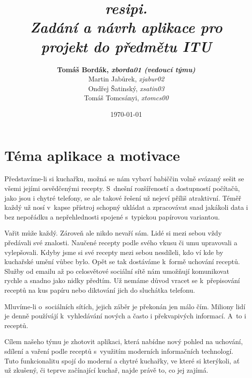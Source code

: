 \documentclass[a4paper, 11pt]{article}
\title {
    {\Huge \emph{\textbf{resipi.}}{\huge}} \\[0.25em] %
    {\Large \emph{Zadání a návrh aplikace pro projekt do předmětu ITU}}
}
\author {
    \textbf{{\Large Tomáš Bordák,}
    \emph{\large xborda01 (vedoucí týmu)}} \\[0.5em]
    {\Large Martin Jabůrek,} 
    \emph{\large xjabur02} \\[0.3em]
    {\Large Ondřej Šatinský,} 
    \emph{\large xsatin03} \\[0.5em]
    {\Large Tomáš Tomcsányi,} 
    \emph{\large xtomcs00}
}
\date{\today}
\begin{document}
    
    
    \clearpage
    \vspace*{\fill}
    \begin{center}
    \begin{minipage}{1\textwidth}
    \maketitle
    \end{minipage}
    \end{center}
    \vfill %
    \clearpage

    \tableofcontents
    \listoffigures
    \newpage


    \section{Téma aplikace a motivace}

    Představíme-li si kuchařku, možná se nám vybaví babiččin volně svázaný sešit se všemi jejími
    osvědčenými recepty. S~dnešní rozšířeností a dostupností počítačů, jako jsou i chytré telefony,
    se ale takové řešení už nejeví příliš atraktivní. Téměř každý už nosí v~kapse přístroj schopný
    ukládat a zpracovávat snad jakákoli data i bez nepořádku a nepřehlednosti spojené s~typickou
    papírovou variantou.

    Vařit může každý. Zároveň ale nikdo nevaří sám. Lidé si mezi sebou vždy předávali své znalosti.
    Naučené recepty podle svého vkusu či umu upravovali a vylepšovali. Kdyby jsme si své recepty
    mezi sebou nesdíleli, kdo ví kde by kuchařské umění vůbec bylo. Opět se tak dostáváme
    k~formě uchování receptů. Služby od emailu až po celosvětové sociální sítě nám umožňují
    komunikovat rychle a snadno jako nidky předtím. Už nemáme důvod vracet se k~přepisování
    receptů na kus papíru nebo diktování jich do sluchátka telefonu.

    Mluvíme-li o~sociálních sítích, jejich záběr je překonán jen málo čím. Miliony lidí je denně
    používájí k~vyhledávání nových a často i překvapivých informací. A~to i receptů.

    Cílem našeho týmu je zhotovit aplikaci, která nabídne nový pohled na uchování,
    sdílení a vaření podle receptů s~využitím moderních informačních technologí.
    Tuto funkcionalitu spojí do moderní a chytré kuchařky,
    ve které si kterýkoli, ať už zkušený, či teprve začínající kuchař, najde
    právě to, co jej zajímá.
\end{document}
